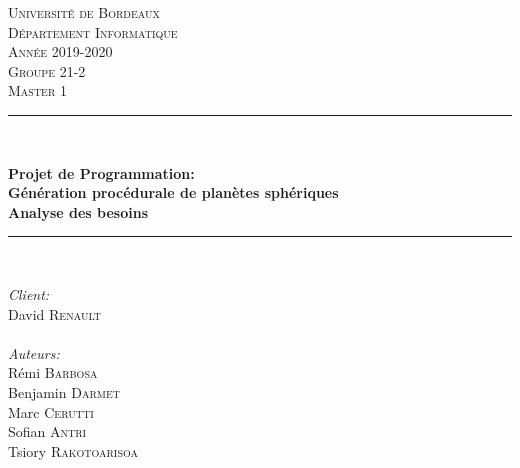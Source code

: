 \documentclass[a4paper]{article}
\begin{document}
\newcommand{\customlarge}[1]{\noindent \Large{\textbf{#1}}}
\newcommand{\customitalic}[1]{\large{\textbf{\textit{#1}}}}
\newcommand{\avis}[2]{\customlarge{Avis personnel -} \customitalic{#1} \\ #2\\[0.8cm]}
\newcommand*{\escape}[1]{\texttt{\textbackslash#1}}

\newcommand{\customquote}[1]{\guillemotleft {#1} \guillemorright~}

\renewcommand{\contentsname}{Sommaire}


\makeatother

\begin{titlepage}
\newcommand{\HRule}{\rule{\linewidth}{0.5mm}} %

\center %
 

\textsc{\LARGE Université de Bordeaux}\\[0.5cm]
\textsc{\large Département Informatique}\\[0.5cm]
\textsc{\large Année 2019-2020}\\[1.5cm]
\textsc{\Large Groupe 21-2}\\[0.2cm] 
\textsc{\large Master 1}\\[0.3cm] 


\HRule \\[0.4cm]
{  \huge \bfseries Projet de Programmation: \\
   \huge \bfseries Génération procédurale de planètes sphériques\\[0.4cm] 
   \Large \bfseries Analyse des besoins
\HRule \\[1.5cm]
 

\begin{minipage}{0.4\textwidth}
\begin{center} \large
\emph{Client:}\\
David \textsc{Renault}\\
~\\
\emph{Auteurs:}\\
Rémi \textsc{Barbosa}\\
Benjamin \textsc{Darmet}\\
Marc \textsc{Cerutti}\\
Sofian \textsc{Antri}\\
Tsiory \textsc{Rakotoarisoa}\\
\end{center}
\end{minipage}
~
}


\end{titlepage}
\end{document}
